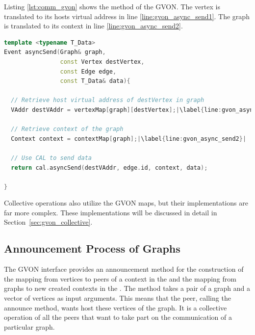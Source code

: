 \noindent Listing \ref{lst:comm_gvon} shows the  method of the
GVON. The vertex is translated to its hosts virtual address in line
\ref{line:gvon_async_send1}. The graph is translated to its context
in line \ref{line:gvon_async_send2}.
\begin{lstlisting}[language=C++, label=lst:comm_gvon,escapechar=|]
template <typename T_Data>
Event asyncSend(Graph& graph, 
                const Vertex destVertex, 
                const Edge edge, 
                const T_Data& data){ 

  // Retrieve host virtual address of destVertex in graph
  VAddr destVAddr = vertexMap[graph][destVertex];|\label{line:gvon_async_send1}|

  // Retrieve context of the graph
  Context context = contextMap[graph];|\label{line:gvon_async_send2}|

  // Use CAL to send data
  return cal.asyncSend(destVAddr, edge.id, context, data);

}
\end{lstlisting}

\noindent Collective operations also utilize the GVON maps, but their
implementations are far more complex. These implementations will be
discussed in detail in Section~\ref{sec:gvon_collective}.


\subsection{Announcement Process of Graphs}
\label{sec:announcement_impl}

The GVON interface provides an announcement method for the
construction of the mapping from vertices to peers of a context in the
 and the mapping from graphs to new created contexts in the
.  The method takes a pair of a graph and a vector of vertices
as input arguments. This means that the peer, calling the announce
method, wants host these vertices of the graph.  It is a collective
operation of all the peers that want to take part on the communication
of a particular graph.

